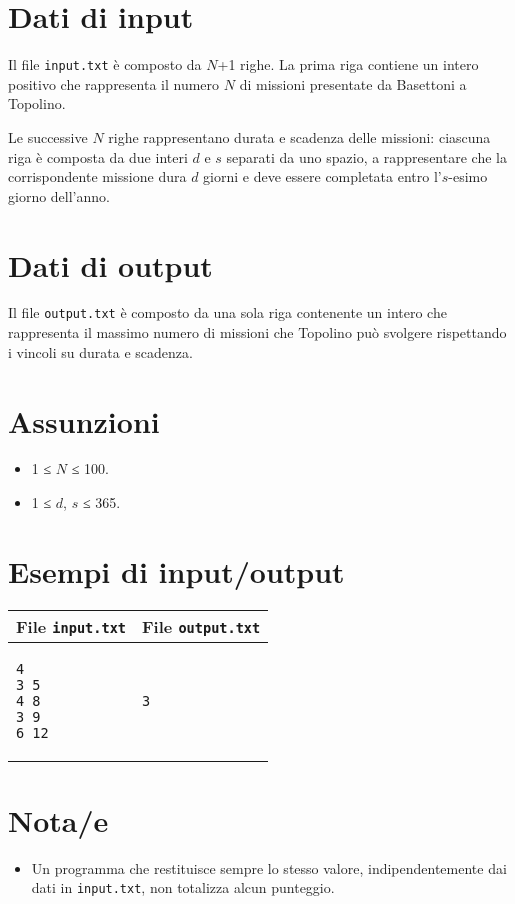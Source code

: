 \documentclass[a4paper,11pt]{article}
\begin{document}
\section*{Dati di input}
  Il file \texttt{input.txt} è composto da $N$+1
righe.
La prima riga contiene un intero positivo che rappresenta il numero
$N$ di missioni presentate da Basettoni a Topolino.

Le successive $N$ righe rappresentano durata e scadenza delle
missioni: ciascuna riga è composta da due interi $d$ e
$s$ separati da uno spazio, a rappresentare che la
corrispondente missione dura $d$ giorni e deve essere
completata entro l'$s$-esimo giorno dell'anno.


\section*{Dati di output}
  
Il file \texttt{output.txt} è composto da una sola riga
contenente un intero che rappresenta il massimo numero di missioni che
Topolino può svolgere rispettando i vincoli su durata e scadenza.

  \section*{Assunzioni}
  \begin{itemize}
  
    \item  1 ≤ $N$ ≤ 100.
    \item  1 ≤ $d$, $s$ ≤ 365.
  \end{itemize}

\section*{Esempi di input/output}

  
    \noindent
    \begin{tabular}{p{11cm}|p{5cm}}
    \toprule
    \textbf{File \texttt{input.txt}}
    & \textbf{File \texttt{output.txt}}
    \\
    \midrule
    \scriptsize
    \begin{verbatim}
4
3 5
4 8
3 9
6 12
\end{verbatim}
    &
    \scriptsize
    \begin{verbatim}
3
\end{verbatim}
    \\
    \bottomrule
    \end{tabular}
  
\section*{Nota/e}
\begin{itemize}
  
    \item Un programma che restituisce sempre lo stesso valore,
indipendentemente dai dati in \texttt{input.txt}, non totalizza
alcun punteggio.
\end{itemize}
\end{document}
